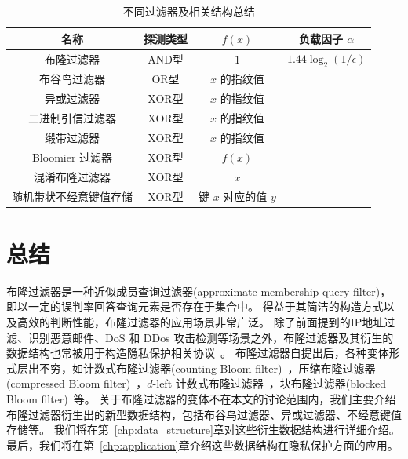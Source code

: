 \begin{table}[ht]
  \centering
  \caption{不同过滤器及相关结构总结}
  \label{tab:construct}
  \begin{tabular}{cccc}
    \toprule
    名称  &  探测类型  &  $f(x)$  & 负载因子 $\alpha$ \\
    \midrule
    布隆过滤器  &  AND型  &  $1$ & $1.44\log_2(1/\epsilon)$  \\
    布谷鸟过滤器  &  OR型  &  $x$ 的指纹值 &   \\
    异或过滤器  &  XOR型  &  $x$ 的指纹值 &  \\
    二进制引信过滤器  & XOR型  &  $x$ 的指纹值 &  \\
    缎带过滤器 & XOR型 & $x$ 的指纹值 &  \\
    Bloomier 过滤器  &  XOR型  &  $f(x)$ & \\
    混淆布隆过滤器  &  XOR型  &  $x$ & \\
    随机带状不经意键值存储 &  XOR型  &  键 $x$ 对应的值 $y$ & \\
    \bottomrule
  \end{tabular}
\end{table}

\section{总结}

布隆过滤器是一种近似成员查询过滤器(approximate membership query filter)，即以一定的误判率回答查询元素是否存在于集合中。
得益于其简洁的构造方式以及高效的判断性能，布隆过滤器的应用场景非常广泛。
除了前面提到的IP地址过滤、识别恶意邮件、DoS 和 DDos 攻击检测等场景之外，布隆过滤器及其衍生的数据结构也常被用于构造隐私保护相关协议~\cite{zhang2024survey}。
布隆过滤器自提出后，各种变体形式层出不穷，如计数式布隆过滤器(counting Bloom filter)~\cite{lifan2000summary}，压缩布隆过滤器(compressed Bloom filter)~\cite{mitzenmacher2002compressed}，$d$-left 计数式布隆过滤器~\cite{bonomi2006improved}，块布隆过滤器(blocked Bloom filter)~\cite{putze2009cache}等。
关于布隆过滤器的变体不在本文的讨论范围内，我们主要介绍布隆过滤器衍生出的新型数据结构，包括布谷鸟过滤器、异或过滤器、不经意键值存储等。
我们将在第~\ref{chp:data_structure}章对这些衍生数据结构进行详细介绍。
最后，我们将在第~\ref{chp:application}章介绍这些数据结构在隐私保护方面的应用。
